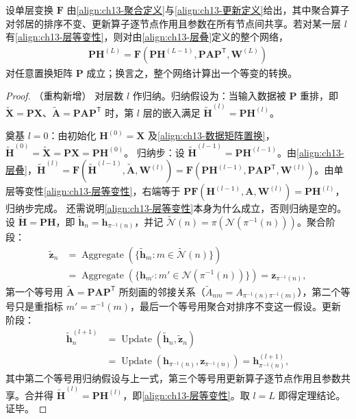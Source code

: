 \documentclass[../../main.tex]{subfiles}
\begin{document}
\begin{theorem}[图神经网络的置换等变性]\label{theorem:ch13-图网络等变性}
设单层变换 $\bm{F}$ 由\eqref{align:ch13-聚合定义}与\eqref{align:ch13-更新定义}给出，其中聚合算子对邻居的排序不变、更新算子逐节点作用且参数在所有节点间共享。若对某一层 $l$ 有\eqref{align:ch13-层等变性}，则对由\eqref{align:ch13-层叠}定义的整个网络，
\begin{align*}
\bm{P}\bm{H}^{(L)}=\bm{F}\!\left(\bm{P}\bm{H}^{(L-1)},\bm{P}\bm{A}\bm{P}^{\mathsf T},\bm{W}^{(L)}\right)
\end{align*}
对任意置换矩阵 $\bm{P}$ 成立；换言之，整个网络计算出一个等变的转换。
\end{theorem}

\begin{proof}（重构新增）
对层数 $l$ 作归纳。归纳假设为：当输入数据被 $\bm{P}$ 重排，即 $\widetilde{\bm{X}}=\bm{P}\bm{X}$、$\widetilde{\bm{A}}=\bm{P}\bm{A}\bm{P}^{\mathsf T}$ 时，第 $l$ 层的嵌入满足 $\widetilde{\bm{H}}^{(l)}=\bm{P}\bm{H}^{(l)}$。\par
奠基 $l=0$：由初始化 $\bm{H}^{(0)}=\bm{X}$ 及\eqref{align:ch13-数据矩阵置换}，$\widetilde{\bm{H}}^{(0)}=\widetilde{\bm{X}}=\bm{P}\bm{X}=\bm{P}\bm{H}^{(0)}$。
归纳步：设 $\widetilde{\bm{H}}^{(l-1)}=\bm{P}\bm{H}^{(l-1)}$。由\eqref{align:ch13-层叠}，$\widetilde{\bm{H}}^{(l)}=\bm{F}(\widetilde{\bm{H}}^{(l-1)},\widetilde{\bm{A}},\bm{W}^{(l)})=\bm{F}(\bm{P}\bm{H}^{(l-1)},\bm{P}\bm{A}\bm{P}^{\mathsf T},\bm{W}^{(l)})$。由单层等变性\eqref{align:ch13-层等变性}，右端等于 $\bm{P}\bm{F}(\bm{H}^{(l-1)},\bm{A},\bm{W}^{(l)})=\bm{P}\bm{H}^{(l)}$，归纳步完成。
还需说明\eqref{align:ch13-层等变性}本身为什么成立，否则归纳是空的。设 $\widetilde{\bm{H}}=\bm{P}\bm{H}$，即 $\widetilde{\bm{h}}_n=\bm{h}_{\pi^{-1}(n)}$，并记 $\widetilde{\mathcal{N}}(n)=\pi(\mathcal{N}(\pi^{-1}(n)))$。聚合阶段：
\begin{align*}
\widetilde{\bm{z}}_n&=\operatorname{Aggregate}\left(\{\widetilde{\bm{h}}_m:m\in\widetilde{\mathcal{N}}(n)\}\right)\\
&=\operatorname{Aggregate}\left(\{\bm{h}_{m'}:m'\in\mathcal{N}(\pi^{-1}(n))\}\right)=\bm{z}_{\pi^{-1}(n)},
\end{align*}
第一个等号用 $\widetilde{\bm{A}}=\bm{P}\bm{A}\bm{P}^{\mathsf T}$ 所刻画的邻接关系（$\widetilde A_{nm}=A_{\pi^{-1}(n)\pi^{-1}(m)}$），第二个等号只是重指标 $m'=\pi^{-1}(m)$，最后一个等号用聚合对排序不变这一假设。更新阶段：
\begin{align*}
\widetilde{\bm{h}}_n^{(l+1)}&=\operatorname{Update}\left(\widetilde{\bm{h}}_n,\widetilde{\bm{z}}_n\right)\\
&=\operatorname{Update}\left(\bm{h}_{\pi^{-1}(n)},\bm{z}_{\pi^{-1}(n)}\right)=\bm{h}_{\pi^{-1}(n)}^{(l+1)},
\end{align*}
其中第二个等号用归纳假设与上一式，第三个等号用更新算子逐节点作用且参数共享。合并得 $\widetilde{\bm{H}}^{(l)}=\bm{P}\bm{H}^{(l)}$，即\eqref{align:ch13-层等变性}。取 $l=L$ 即得定理结论。证毕。
\end{proof}
\end{document}
